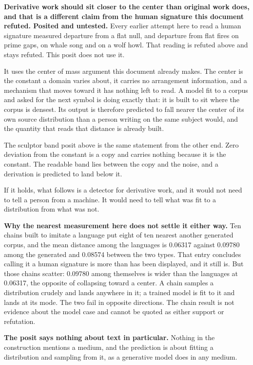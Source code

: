 \textbf{Derivative work should sit closer to the center than original work does, and that is a different claim from the human signature this document refuted. Posited and untested.} Every earlier attempt here to read a human signature measured departure from a flat null, and departure from flat fires on prime gaps, on whale song and on a wolf howl. That reading is refuted above and stays refuted. This posit does not use it.

It uses the center of mass argument this document already makes. The center is the constant a domain varies about, it carries no arrangement information, and a mechanism that moves toward it has nothing left to read. A model fit to a corpus and asked for the next symbol is doing exactly that: it is built to sit where the corpus is densest. Its output is therefore predicted to fall nearer the center of its own source distribution than a person writing on the same subject would, and the quantity that reads that distance is already built.

The sculptor band posit above is the same statement from the other end. Zero deviation from the constant is a copy and carries nothing because it is the constant. The readable band lies between the copy and the noise, and a derivation is predicted to land below it.

If it holds, what follows is a detector for derivative work, and it would not need to tell a person from a machine. It would need to tell what was fit to a distribution from what was not.

\textbf{Why the nearest measurement here does not settle it either way.} Ten chains built to imitate a language put eight of ten nearest another generated corpus, and the mean distance among the languages is 0.06317 against 0.09780 among the generated and 0.08574 between the two types. That entry concludes calling it a human signature is more than has been displayed, and it still is. But those chains scatter: 0.09780 among themselves is wider than the languages at 0.06317, the opposite of collapsing toward a center. A chain samples a distribution crudely and lands anywhere in it; a trained model is fit to it and lands at its mode. The two fail in opposite directions. The chain result is not evidence about the model case and cannot be quoted as either support or refutation.

\textbf{The posit says nothing about text in particular.} Nothing in the construction mentions a medium, and the prediction is about fitting a distribution and sampling from it, as a generative model does in any medium.

